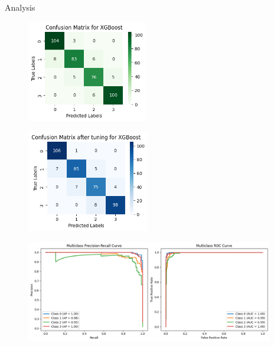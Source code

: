 \documentclass[14pt, aspectratio=169]{beamer}
\begin{document}
\begin{frame}[allowframebreaks]{Analysis}
\begin{adjustwidth}{-0.75cm}{1.25cm}
\begin{figure}[H]
\begin{minipage}{0.45\textwidth}
        \label{cmat_tuned_SVM}
    \end{minipage}
\end{figure}
\begin{figure}[H]
    \centering
		\begin{minipage}{0.45\textwidth}
			\centering
			\includegraphics[height=12em]{../report/cmat_XG.png}
			\label{cmat_XG}
		\end{minipage}
    \hfill
    \begin{minipage}{0.45\textwidth}
        \centering
        \includegraphics[height=12em]{../report/cmat_tuned_XG.png}
        \label{cmat_tuned_XG}
    \end{minipage}
\end{figure}

\end{adjustwidth}
\begin{adjustwidth}{-0.3cm}{0cm}
\begin{figure}[H]
  \centering
  \includegraphics[height=12em]{../report/ra_pr_LR.png}
  \label{ra_pr_LR}
\end{figure}


\end{adjustwidth}
\end{frame}
\end{document}
